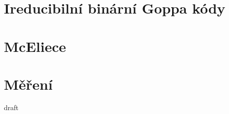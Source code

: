 \documentclass[thesis=M,czech,hidelinks]{FITthesis}[2012/06/26]
\newcommand{\0}{{\textcolor[gray]{0.75}{0}}}
\begin{document}
\section{Ireducibilní binární Goppa kódy}

\section{McEliece}

\section{Měření}




\begin{conclusion}
    draft \cite{Schanck}
\end{conclusion}




\end{document}
